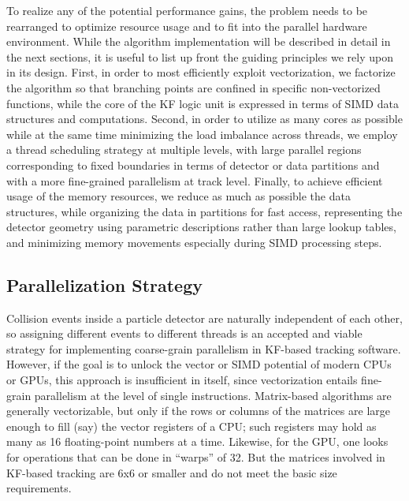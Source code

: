 \documentclass[a4paper,11pt]{article}
\begin{document}
To realize any of the potential performance gains, the problem needs to be rearranged to optimize resource usage and to fit into the parallel hardware environment. 
While the algorithm implementation will be described in detail in the next sections, it is useful to list up front the guiding principles we rely upon in its design.
First, in order to most efficiently exploit vectorization, we factorize the algorithm so that branching points are confined in specific non-vectorized functions, while the core of the KF logic unit is expressed in terms of SIMD data structures and computations.
Second, in order to utilize as many cores as possible while at the same time minimizing the load imbalance across threads, we employ a thread scheduling strategy at multiple levels, with large parallel regions corresponding to fixed boundaries in terms of detector or data partitions and with a more fine-grained parallelism at track level.
Finally, to achieve efficient usage of the memory resources, we reduce as much as possible the data structures, while organizing the data in partitions for fast access, representing the detector geometry using parametric descriptions rather than large lookup tables, and minimizing memory movements especially during SIMD processing steps.

\subsection{Parallelization Strategy}

Collision events inside a particle detector are naturally independent of each other, so assigning different events to different threads is an accepted and viable strategy for implementing coarse-grain parallelism in KF-based tracking software. However, if the goal is to unlock the vector or SIMD potential of modern CPUs or GPUs, this approach is insufficient in itself, since vectorization entails fine-grain parallelism at the level of single instructions. Matrix-based algorithms are generally vectorizable, but only if the rows or columns of the matrices are large enough to fill (say) the vector registers of a CPU; such registers may hold as many as 16 floating-point numbers at a time. Likewise, for the GPU, one looks for operations that can be done in ``warps'' of 32. But the matrices involved in KF-based tracking are 6x6 or smaller and do not meet the basic size requirements.
\end{document}
